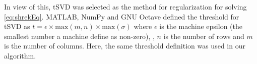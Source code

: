 			In view of this, \gls{tSVD} was selected as the method for regularization for solving \cref{eq:shrekEq}.
			MATLAB, NumPy and GNU Octave defined the threshold for \gls{tSVD} as $t=\epsilon\times \mathrm{max}(m,n)\times \mathrm{max}(\sigma)$ where $\epsilon$ is the machine epsilon (the smallest number a machine define as non-zero), , $n$ is the number of rows and $m$ is the number of columns. 
			Here, the same threshold definition was used in our algorithm.
			
%			
%			
%			
